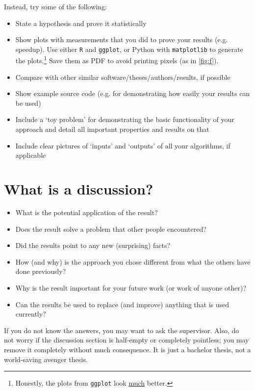 Instead, try some of the following:
\begin{itemize}
\item State a hypothesis and prove it statistically
\item Show plots with measurements that you did to prove your results (e.g. speedup). Use either \texttt{R} and \texttt{ggplot}, or Python with \texttt{matplotlib} to generate the plots.\footnote{Honestly, the plots from \texttt{ggplot} look \underline{much} better.} Save them as PDF to avoid printing pixels (as in \cref{fig:f}).
\item Compare with other similar software/theses/authors/results, if possible
\item Show example source code (e.g. for demonstrating how easily your results can be used)
\item Include a `toy problem' for demonstrating the basic functionality of your approach and detail all important properties and results on that
\item Include clear pictures of `inputs' and `outputs' of all your algorithms, if applicable
\end{itemize}

\section{What is a discussion?}
\begin{itemize}
\item What is the potential application of the result?
\item Does the result solve a problem that other people encountered?
\item Did the results point to any new (surprising) facts?
\item How (and why) is the approach you chose different from what the others have done previously?
\item Why is the result important for your future work (or work of anyone other)?
\item Can the results be used to replace (and improve) anything that is used currently?
\end{itemize}

If you do not know the answers, you may want to ask the supervisor. Also, do not worry if the discussion section is half-empty or completely pointless; you may remove it completely without much consequence. It is just a bachelor thesis, not a world-saving avenger thesis.
